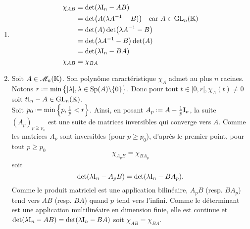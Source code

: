 \begin{solution}
    \begin{enumerate}
        \item \begin{align*}
        \chi_{AB} &= \det(\lambda \mathrm{I}_n - AB) \\
        &= \det(A(\lambda A^{-1} - B)) \quad \text{car } A \in \mathrm{GL}_n(\mathbb{K}) \\
        &= \det(A) \det(\lambda A^{-1} - B) \\
        &= \det(\lambda A^{-1} - B) \det(A) \\
        &= \det(\lambda \mathrm{I}_n - BA) \\
        \chi_{AB} &= \chi_{BA}
    \end{align*}
    \item Soit $A \in \mathscr{M}_n(\mathbb{K})$. Son polynôme caractéristique $\chi_A$ admet au plus $n$ racines. \\
    Notons $r \defeq \min \big\{ |\lambda|, \lambda \in \Sp(A) \backslash \{0\} \big\}$. Donc pour tout $t \in ]0,r[, \chi_A(t) \not=0$ soit $t \mathrm{I}_n - A \in \mathrm{GL}_n(\mathbb{K})$. \\
    Soit $p_0 \defeq \min \left\{ p, \frac{1}{p} < r \right\}$. Ainsi, en posant $A_p \defeq A - \frac{1}{p} \I_n$, la suite $(A_p)_{p \geqslant p_0}$ est une suite de matrices inversibles qui converge vers $A$. Comme les matrices $A_p$ sont inversibles (pour $p \geqslant p_0$), d'après le premier point, pour tout $p \geqslant p_0$
    $$\chi_{A_p B} = \chi_{B A_p}$$
    soit 
    $$\det(\lambda \mathrm{I}_n - A_p B) = \det(\lambda \mathrm{I}_n - B A_p).$$
    Comme le produit matriciel est une application bilinéaire, $A_p B$ (resp. $B A_p$) tend vers $AB$ (resp. $BA$) quand $p$ tend vers l'infini. Comme le déterminant est une application multilinéaire en dimension finie, elle est continue et $\det(\lambda \mathrm{I}_n - A B) = \det(\lambda \mathrm{I}_n - B A)$ soit $\chi_{A B} = \chi_{B A}$. \\
    \end{enumerate}
\end{solution}

